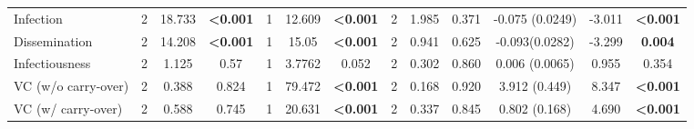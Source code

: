 \documentclass[12pt]{article}
\begin{document}
\begin{table}
{\begin{tabular}{l|ccc|ccc|ccc|ccc}
Infection                   & 2           & 18.733    & \textbf{\textless0.001} & 1           & 12.609    & \textbf{\textless0.001} & 2           & 1.985     & 0.371                   & -0.075 (0.0249)  & -3.011  & \textbf{\textless0.001} \\
Dissemination               & 2           & 14.208    & \textbf{\textless0.001} & 1           & 15.05     & \textbf{\textless0.001} & 2           & 0.941     & 0.625                   & -0.093(0.0282)   & -3.299  & \textbf{0.004}          \\
Infectiousness              & 2           & 1.125     & 0.57                    & 1           & 3.7762    & 0.052                   & 2           & 0.302     & 0.860                   & 0.006 (0.0065)   & 0.955   & 0.354                   \\
VC (w/o carry-over)         & 2           & 0.388     & 0.824                   & 1           & 79.472    & \textbf{\textless0.001} & 2           & 0.168     & 0.920                   & 3.912 (0.449)    & 8.347   & \textbf{\textless0.001} \\
VC (w/ carry-over)          & 2           & 0.588     & 0.745                   & 1           & 20.631    & \textbf{\textless0.001} & 2           & 0.337     & 0.845                   & 0.802 (0.168)    & 4.690   & \textbf{\textless0.001} \\
\end{tabular}}
\end{table}

\end{document}
